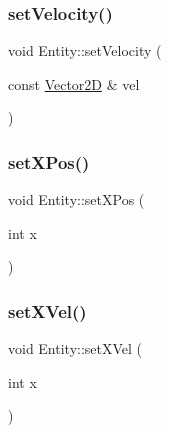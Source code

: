 \mbox{\label{class_entity_af41c73b5b2a7e68a7f285b12d0dab9f1}} 
\subsubsection{\texorpdfstring{set\+Velocity()}{setVelocity()}}
{\footnotesize\ttfamily void Entity\+::set\+Velocity (\begin{DoxyParamCaption}\item[{const \hyperlink{_vector2_d_8hpp_aa1f1145650f1dd9bddf7335ec6434d7c}{Vector2D} \&}]{vel }\end{DoxyParamCaption})\hspace{0.3cm}{\ttfamily [inline]}}

\mbox{\label{class_entity_a8afb8aa252cbbffecc2dff0669cb2896}} 
\subsubsection{\texorpdfstring{set\+X\+Pos()}{setXPos()}}
{\footnotesize\ttfamily void Entity\+::set\+X\+Pos (\begin{DoxyParamCaption}\item[{int}]{x }\end{DoxyParamCaption})\hspace{0.3cm}{\ttfamily [inline]}}

\mbox{\label{class_entity_a7f20a2190046121150e5903ec769e9dc}} 
\subsubsection{\texorpdfstring{set\+X\+Vel()}{setXVel()}}
{\footnotesize\ttfamily void Entity\+::set\+X\+Vel (\begin{DoxyParamCaption}\item[{int}]{x }\end{DoxyParamCaption})\hspace{0.3cm}{\ttfamily [inline]}}

\mbox{\label{class_entity_a66278a362d97e2a30912c2a31962bfb9}} 

